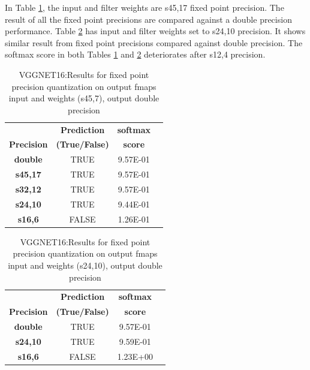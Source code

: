 \documentclass[conference]{IEEEtran}
\begin{document}
In Table \ref{res3}, the input and filter weights are s45,17 fixed point precision. The result of all the fixed point precisions are compared against a double precision performance. 
Table \ref{res4} has input and filter weights set to s24,10 precision. It shows similar result from fixed point precisions compared against double precision. 
The softmax score in both Tables \ref{res3} and \ref{res4} deteriorates after s12,4 precision. 

\begin{table}[!ht]
\centering
\caption{VGGNET16:Results for fixed point precision quantization on output fmaps input and weights (s45,7), output double precision}
\label{res3}
\begin{tabular}{cccc}
\hline
                   & \textbf{Prediction} & \textbf{softmax}  \\
\textbf{Precision} & \textbf{(True/False)} & \textbf{score}         \\ \hline
\color{red}\textbf{double}    & \color{red}TRUE                & \color{red}9.57E-01                    \\
\textbf{s45,17}     & TRUE                & 9.57E-01          \\
\textbf{s32,12}    & TRUE                & 9.57E-01          \\
\textbf{s24,10}    & TRUE                & 9.44E-01          \\
\textbf{s16,6}     & FALSE               & 1.26E-01          \\ \hline
\end{tabular}
\end{table}

\begin{table}[!ht]
\centering
\caption{VGGNET16:Results for fixed point precision quantization on output fmaps input and weights (s24,10), output double precision}
\label{res4}
\begin{tabular}{cccc}
\hline
                   & \textbf{Prediction}   & \textbf{softmax}  \\ 
\textbf{Precision} & \textbf{(True/False)} & \textbf{score}           \\ \hline
\color{red}\textbf{double}    &\color{red} TRUE                  & \color{red}9.57E-01                     \\
\textbf{s24,10}    & TRUE                  & 9.59E-01        \\
\textbf{s16,6}     & FALSE                 & 1.23E+00          \\ \hline
\end{tabular}
\end{table}
\end{document}
